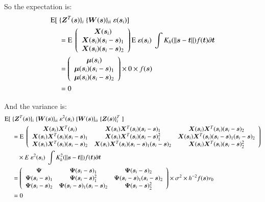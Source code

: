 \documentclass[authoryear, review, 11pt]{elsarticle}
\begin{document}
        So the expectation is:
        \begin{align}
            \text{E} [ \; &\{ \bm{Z}^T(\bm{s}) \}_i \; \{ \bm{W}(\bm{s}) \}_{ii} \; \varepsilon(\bm{s}_i) ] \notag \\
            &= \text{E} \; \left( \begin{array}{c} \bm{X}(\bm{s}_i) \\ \bm{X}(\bm{s}_i) (\bm{s}_i - \bm{s})_1 \\ \bm{X}(\bm{s}_i) (\bm{s}_i - \bm{s})_2 \end{array} \right) \text{E} \; \varepsilon(\bm{s}_i) \; \int K_h(\| \bm{s} - \bm{t} \|) f(\bm{t}) \partial \bm{t} \notag \\
            &= \left( \begin{array}{c} \bm{\mu}(\bm{s}_i) \\ \bm{\mu}(\bm{s}_i) (\bm{s}_i - \bm{s})_1 \\ \bm{\mu}(\bm{s}_i) (\bm{s}_i - \bm{s})_2 \end{array} \right) \times 0 \times f(\bm{s}) \notag \\
            &= 0
        \end{align}
    
    
        And the variance is:
        \begin{align}
            \text{E} [ \; &\{ \bm{Z}^T(\bm{s}) \}_i \; \{ \bm{W}(\bm{s}) \}_{ii} \; \varepsilon^2(\bm{s}_i) \; \{ \bm{W}(\bm{s}) \}_{ii} \; \{ \bm{Z}(\bm{s}) \}^T_i \;   ] \notag \\
            &= \text{E} \; \left( \begin{array}{ccc} \bm{X}(\bm{s}_i) \bm{X}^T(\bm{s}_i) & \bm{X}(\bm{s}_i) \bm{X}^T(\bm{s}_i) (\bm{s}_i - \bm{s})_1 & \bm{X}(\bm{s}_i) \bm{X}^T(\bm{s}_i) (\bm{s}_i - \bm{s})_2 \\ \bm{X}(\bm{s}_i) \bm{X}^T(\bm{s}_i) (\bm{s}_i - \bm{s})_1 & \bm{X}(\bm{s}_i) \bm{X}^T(\bm{s}_i) (\bm{s}_i - \bm{s})^2_1 & \bm{X}(\bm{s}_i) \bm{X}^T(\bm{s}_i) (\bm{s}_i - \bm{s})_1 (\bm{s}_i - \bm{s})_2 \\ \bm{X}(\bm{s}_i) \bm{X}^T(\bm{s}_i) (\bm{s}_i - \bm{s})_2 & \bm{X}(\bm{s}_i) \bm{X}^T(\bm{s}_i) (\bm{s}_i - \bm{s})_1 (\bm{s}_i - \bm{s})_2 & \bm{X}(\bm{s}_i) \bm{X}^T(\bm{s}_i) (\bm{s}_i - \bm{s})^2_2 \end{array} \right)  \notag \\
            & \:\:\:\: \times E \; \varepsilon^2(\bm{s}_i) \; \int K^2_h(\| \bm{s} - \bm{t} \|) f(\bm{t}) \partial \bm{t} \notag \\
            &= \left( \begin{array}{ccc} \bm{\Psi} & \bm{\Psi} (\bm{s}_i - \bm{s})_1 & \bm{\Psi} (\bm{s}_i - \bm{s})_2 \\ \bm{\Psi} (\bm{s}_i - \bm{s})_1 & \bm{\Psi} (\bm{s}_i - \bm{s})^2_1 & \bm{\Psi} (\bm{s}_i - \bm{s})_1 (\bm{s}_i - \bm{s})_2 \\ \bm{\Psi} (\bm{s}_i - \bm{s})_2 & \bm{\Psi} (\bm{s}_i - \bm{s})_1 (\bm{s}_i - \bm{s})_2 & \bm{\Psi} (\bm{s}_i - \bm{s})^2_2 \end{array} \right) \times \sigma^2 \times h^{-2} f(\bm{s}) \nu_0 \notag \\
            &= 0
        \end{align}
  
\end{document}
